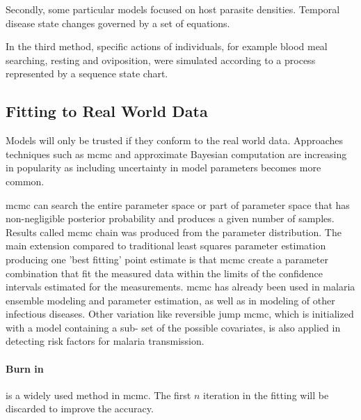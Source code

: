 \documentclass[a4paper, 12pt, twoside]{article}
\begin{document}
Secondly, some particular models focused on host parasite densities.
Temporal disease state changes governed by a set of equations.

In the third method, specific actions of individuals, for example blood meal searching, resting and oviposition, were simulated according to a process represented by a sequence state chart.

\subsection{Fitting to Real World Data}
Models will only be trusted if they conform to the real world data.
Approaches techniques such as \gls{mcmc} \cite{Hastings1970} and approximate Bayesian computation are increasing in popularity as including uncertainty in model parameters becomes more common. 

\gls{mcmc} can search the entire parameter space or part of parameter space that has non-negligible posterior probability and produces a given number of samples.
Results called \gls{mcmc} chain was produced from the parameter distribution. 
The main extension compared to traditional least squares parameter estimation producing one ’best fitting’ point estimate is that \gls{mcmc} create a parameter combination that fit the measured data within the limits of the confidence intervals estimated for the measurements.
\gls{mcmc} has already been used in malaria ensemble modeling\cite{Cameron2015,Penny2015,Penny2015a} and parameter estimation, as well as in modeling of other infectious diseases.
Other variation like reversible jump \gls{mcmc}, which is initialized with a model containing a sub- set of the possible covariates, is also applied in detecting risk factors for malaria transmission\cite{Millar2018a}.

\paragraph{Burn in}%
\label{par:burn_in}
is a widely used method in \gls{mcmc}. The first $n$ iteration in the fitting will be discarded to improve the accuracy.
\end{document}
